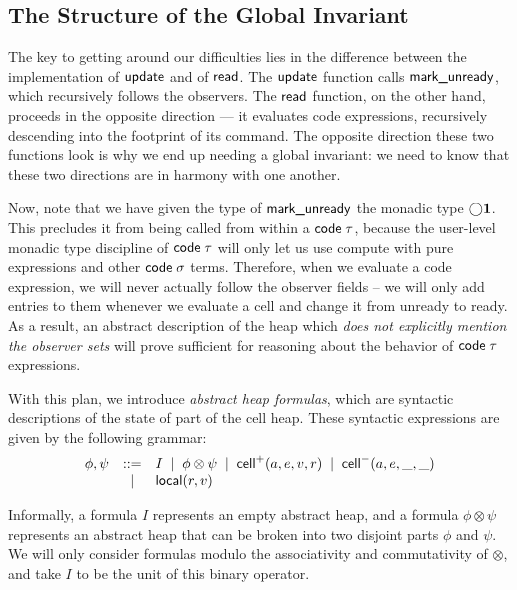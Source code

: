 \documentclass[preprint,natbib]{sigplanconf}
\begin{document}
\subsection{The Structure of the Global Invariant}

The key to getting around our difficulties lies in the difference
between the implementation of $\mbox{\textsf{{update}}}$ and of $\mbox{\textsf{{read}}}$.
The $\mbox{\textsf{{update}}}$ function calls $\mbox{\textsf{{mark\_unready}}}$, which 
recursively follows the observers. The $\mbox{\textsf{{read}}}$ function, on the 
other hand, proceeds in the opposite direction --- it evaluates code expressions,
recursively descending into the footprint of its command. The opposite
direction these two functions look is why we end up needing a global
invariant: we need to know that these two directions are in harmony
with one another.

Now, note that we have given the type of $\mbox{\textsf{{mark\_unready}}}$ the
monadic type $\bigcirc{\mathbf{1}}$. This precludes it from being called
from within a $\mbox{\textsf{{code}}}\;{\tau}$, because the user-level monadic type 
discipline of $\mbox{\textsf{{code}}}\;{\tau}$ will only let us use compute with pure 
expressions and other $\mbox{\textsf{{code}}}\;{\sigma}$ terms. 
Therefore, when we evaluate a code expression, we will never actually
follow the observer fields -- we will only add entries to them
whenever we evaluate a cell and change it from unready to ready.  As a
result, an abstract description of the heap which \emph{does not
  explicitly mention the observer sets} will prove sufficient for
reasoning about the behavior of $\mbox{\textsf{{code}}}\;{\tau}$ expressions. 

With this plan, we introduce \emph{abstract heap formulas}, which are
syntactic descriptions of the state of part of the cell heap. These
syntactic expressions are given by the following grammar:
\begin{displaymath}
  \begin{array}{lcl}
    \phi,\psi & ::= & I \;\;|\;\; \phi \otimes \psi \;\;|\;\; \mbox{\textsf{{cell}}}^{+}({a}, {e}, {v}, {r}) \;\;|\;\; \mbox{\textsf{{cell}}}^{-}({a}, {e}, {\_}, {\_})\\
         &  |  & \mbox{\textsf{{local}}}({r}, {v}) 
  \end{array}
\end{displaymath}

Informally, a formula $I$ represents an empty abstract heap, and a
formula $\phi \otimes \psi$ represents an abstract heap that can be
broken into two disjoint parts $\phi$ and $\psi$. We will only
consider formulas modulo the associativity and commutativity of
$\otimes$, and take $I$ to be the unit of this binary operator.
\end{document}
